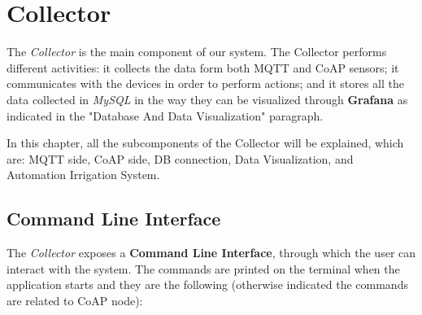 \section{Collector}
The \textit{Collector} is the main component of our system. The Collector performs different activities: it collects the data form both MQTT and CoAP sensors; it communicates with the devices in order to perform actions; and it stores all the data collected in \textit{MySQL} in the way they can be visualized through \textbf{Grafana} as indicated in the "Database And Data Visualization" paragraph.

In this chapter, all the subcomponents of the Collector will be explained, which are:  MQTT side, CoAP side, DB connection, Data Visualization, and Automation Irrigation System.

\subsection{Command Line Interface}
The \textit{Collector} exposes a \textbf{Command Line Interface}, through which the user can interact with the system. The commands are printed on the terminal when the application starts and they are the following (otherwise indicated the commands are related to CoAP node):

